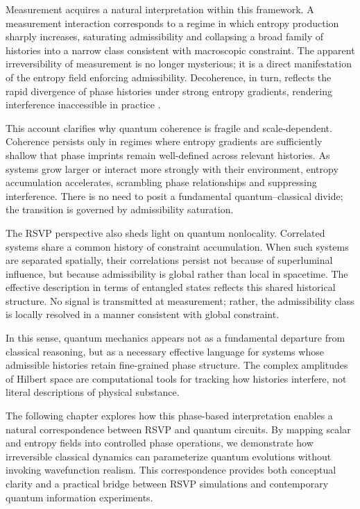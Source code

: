 \documentclass[11pt,oneside]{book}
\begin{document}
Measurement acquires a natural interpretation within this framework. A measurement interaction corresponds to a regime in which entropy production sharply increases, saturating admissibility and collapsing a broad family of histories into a narrow class consistent with macroscopic constraint. The apparent irreversibility of measurement is no longer mysterious; it is a direct manifestation of the entropy field enforcing admissibility. Decoherence, in turn, reflects the rapid divergence of phase histories under strong entropy gradients, rendering interference inaccessible in practice \cite{zurek2003}.

This account clarifies why quantum coherence is fragile and scale-dependent. Coherence persists only in regimes where entropy gradients are sufficiently shallow that phase imprints remain well-defined across relevant histories. As systems grow larger or interact more strongly with their environment, entropy accumulation accelerates, scrambling phase relationships and suppressing interference. There is no need to posit a fundamental quantum--classical divide; the transition is governed by admissibility saturation.

The RSVP perspective also sheds light on quantum nonlocality. Correlated systems share a common history of constraint accumulation. When such systems are separated spatially, their correlations persist not because of superluminal influence, but because admissibility is global rather than local in spacetime. The effective description in terms of entangled states reflects this shared historical structure. No signal is transmitted at measurement; rather, the admissibility class is locally resolved in a manner consistent with global constraint.

In this sense, quantum mechanics appears not as a fundamental departure from classical reasoning, but as a necessary effective language for systems whose admissible histories retain fine-grained phase structure. The complex amplitudes of Hilbert space are computational tools for tracking how histories interfere, not literal descriptions of physical substance.

The following chapter explores how this phase-based interpretation enables a natural correspondence between RSVP and quantum circuits. By mapping scalar and entropy fields into controlled phase operations, we demonstrate how irreversible classical dynamics can parameterize quantum evolutions without invoking wavefunction realism. This correspondence provides both conceptual clarity and a practical bridge between RSVP simulations and contemporary quantum information experiments.
\end{document}
